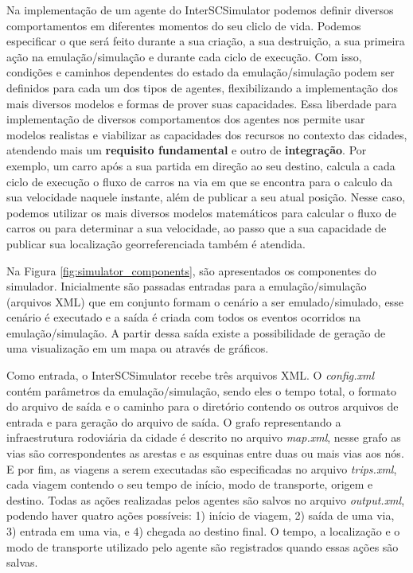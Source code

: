 Na implementação de um agente do InterSCSimulator podemos definir diversos comportamentos em diferentes momentos do seu cliclo de vida.
Podemos especificar o que será feito durante a sua criação, a sua destruição, a sua primeira ação na emulação/simulação e durante cada ciclo de execução.
Com isso, condições e caminhos dependentes do estado da emulação/simulação podem ser definidos para cada um dos tipos de agentes, flexibilizando a implementação dos
mais diversos modelos e formas de prover suas capacidades.
Essa liberdade para implementação de diversos comportamentos dos agentes nos permite usar modelos realistas e viabilizar as capacidades dos recursos no contexto das cidades,
atendendo mais um \textbf{requisito fundamental} e outro de \textbf{integração}.
Por exemplo, um carro após a sua partida em direção ao seu destino, calcula a cada ciclo de execução o fluxo de carros na via em que se encontra para o calculo da
sua velocidade naquele instante, além de publicar a seu atual posição.
Nesse caso, podemos utilizar os mais diversos modelos matemáticos para calcular o fluxo de carros ou para determinar a sua velocidade, ao passo que a sua capacidade
de publicar sua localização georreferenciada também é atendida.

Na Figura \ref{fig:simulator_components}, são apresentados os componentes do simulador.
Inicialmente são passadas entradas para a emulação/simulação (arquivos XML) que em conjunto formam o cenário a ser emulado/simulado, esse cenário é executado e a
saída é criada com todos os eventos ocorridos na emulação/simulação.
A partir dessa saída existe a possibilidade de geração de uma visualização em um mapa ou através de gráficos.


Como entrada, o InterSCSimulator recebe três arquivos XML. O \textit{config.xml} contém parâmetros da emulação/simulação, sendo eles o tempo total, o formato do
arquivo de saída e o caminho para o diretório contendo os outros arquivos de entrada e para geração do arquivo de saída.
O grafo representando a infraestrutura rodoviária da cidade é descrito no arquivo \textit{map.xml}, nesse grafo as vias são correspondentes as arestas e as esquinas entre
duas ou mais vias aos nós.
E por fim, as viagens a serem executadas são especificadas no arquivo \textit{trips.xml}, cada viagem contendo o seu tempo de início, modo de transporte, origem e destino.
Todas as ações realizadas pelos agentes são salvos no arquivo \textit{output.xml}, podendo haver quatro ações possíveis: 1) início de viagem, 2) saída de uma via,
3) entrada em uma via, e 4) chegada ao destino final.
O tempo, a localização e o modo de transporte utilizado pelo agente são registrados quando essas ações são salvas.

